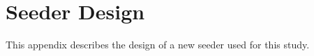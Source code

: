 \chapter{Seeder Design}
\label{app:seeder}

This appendix describes the design of a new seeder used for this study.